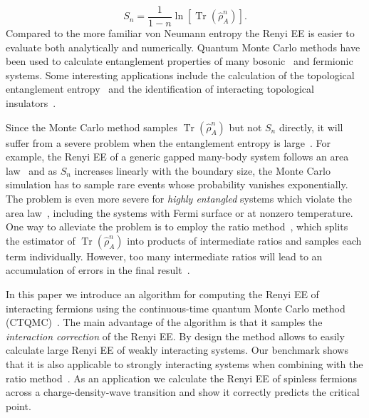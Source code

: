 \documentclass[12pt,onecolumn,english,prl,showpacs,nofootinbib]{revtex4-1}
\DeclareMathOperator{\Tr}{Tr}
\newcommand{\red}[1]{[{\bf \color{red}{#1}}]}
\begin{document}
\begin{equation}
S_{n} = \frac{1}{1-n}\ln \left[\Tr (\hat{\rho}_{A}^{n})\right].
\label{eq:REE}
\end{equation}
Compared to the more familiar von Neumann entropy the Renyi EE is easier to evaluate both analytically and numerically. Quantum Monte Carlo methods have been used to calculate entanglement properties of many bosonic~\cite{Buividovich:2008hz, Hastings:2010dca, Herdman:2014jqa} and fermionic~\cite{Zhang:2011ka, McMinis:2013dp, Grover:2013cs, Broecker:2014ud} systems. Some interesting applications include the calculation of the topological entanglement entropy~\cite{Levin:2006ij, Kitaev:2006dn, Isakov:2011fz} and the identification of interacting topological insulators~\cite{2014PhRvB..89l5121A, Anonymous:XiXakTeu}. 

Since the Monte Carlo method samples $\Tr (\hat{\rho}_{A}^{n})$ but not $S_{n}$ directly, it will suffer from a severe problem when the entanglement entropy is large~\cite{Hastings:2010dca, Zhang:2011ka, Grover:2013cs}. For example, the Renyi EE of a generic gapped many-body system follows an area law~\cite{Eisert:2010hq} and as $S_{n}$ increases linearly with the boundary size, the Monte Carlo simulation has to sample rare events whose probability vanishes exponentially. The problem is even more severe for \emph{highly entangled} systems which violate the area law~\cite{PhysRevLett.96.010404, PhysRevLett.96.100503, PhysRevLett.105.050502,PhysRevX.2.011012, PhysRevLett.111.210402,PhysRevLett.112.160403}, including the systems with Fermi surface or at nonzero temperature. One way to alleviate the problem is to employ the ratio method~\cite{Hastings:2010dca, Humeniuk:2012cq}, which splits the estimator of $\Tr(\hat{\rho}_{A}^{n})$ into products of intermediate ratios and samples each term individually. However, too many intermediate ratios will lead to an accumulation of errors in the final result~\cite{Humeniuk:2012cq}. 

In this paper we introduce an algorithm for computing the Renyi EE of interacting fermions using the continuous-time quantum Monte Carlo method (CTQMC)~\cite{Rubtsov:2005iw, Gull:2011jd}. The main advantage of the algorithm is that it samples the \emph{interaction correction} of the Renyi EE. By design the method allows to easily calculate large Renyi EE of  weakly interacting systems. Our benchmark shows that it is also applicable to strongly interacting systems when combining  with the ratio method~\cite{Hastings:2010dca, Humeniuk:2012cq}. As an application we calculate the Renyi EE of spinless fermions across a charge-density-wave transition and show it correctly predicts the critical point. 
\end{document}

